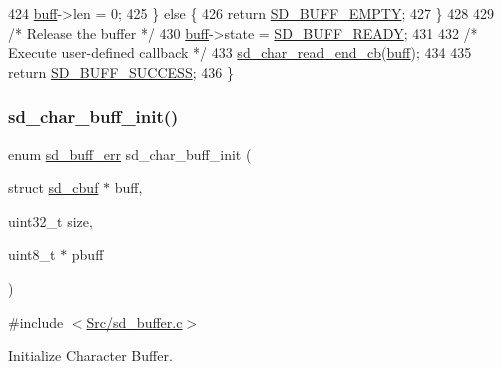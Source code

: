 \begin{DoxyCode}
424             \mbox{\hyperlink{structsd__cbuf_a8b212742c92a124f2eb4a244acc19f7c}{buff}}->len = 0;
425     \} \textcolor{keywordflow}{else} \{
426         \textcolor{keywordflow}{return} \mbox{\hyperlink{group___s_d___buffer___types_gga012d8a07d989f00e3f9c4a2f62743de4ae7df9fe6e4740934def6178fe96c6f6f}{SD\_BUFF\_EMPTY}};
427     \}
428   
429     \textcolor{comment}{/* Release the buffer */}
430     \mbox{\hyperlink{structsd__cbuf_a8b212742c92a124f2eb4a244acc19f7c}{buff}}->state = \mbox{\hyperlink{group___s_d___buffer___types_gga52f14e9c7b7d9ba092e1cd615559012ba99d36bbc57255841b60f77f1a0059c7c}{SD\_BUFF\_READY}};
431   
432     \textcolor{comment}{/* Execute user-defined callback */}
433     \mbox{\hyperlink{group___s_d___buffer___functions_ga17d8b9804dc4f2cbfbf03a5c23d227e7}{sd\_char\_read\_end\_cb}}(\mbox{\hyperlink{structsd__cbuf_a8b212742c92a124f2eb4a244acc19f7c}{buff}});
434   
435     \textcolor{keywordflow}{return} \mbox{\hyperlink{group___s_d___buffer___types_gga012d8a07d989f00e3f9c4a2f62743de4a57815778d30aaa889a6e73dfc081e5f6}{SD\_BUFF\_SUCCESS}};
436 \}
\end{DoxyCode}
\mbox{\label{group___s_d___buffer___functions_ga5c105cd566aea7ca95c4b9702b083cc1}} 
\subsubsection{\texorpdfstring{sd\+\_\+char\+\_\+buff\+\_\+init()}{sd\_char\_buff\_init()}}
{\footnotesize\ttfamily enum \mbox{\hyperlink{group___s_d___buffer___types_ga012d8a07d989f00e3f9c4a2f62743de4}{sd\+\_\+buff\+\_\+err}} sd\+\_\+char\+\_\+buff\+\_\+init (\begin{DoxyParamCaption}\item[{struct \mbox{\hyperlink{structsd__cbuf}{sd\+\_\+cbuf}} $\ast$}]{buff,  }\item[{uint32\+\_\+t}]{size,  }\item[{uint8\+\_\+t $\ast$}]{pbuff }\end{DoxyParamCaption})}



{\ttfamily \#include $<$\mbox{\hyperlink{sd__buffer_8c}{Src/sd\+\_\+buffer.\+c}}$>$}



Initialize Character Buffer. 


